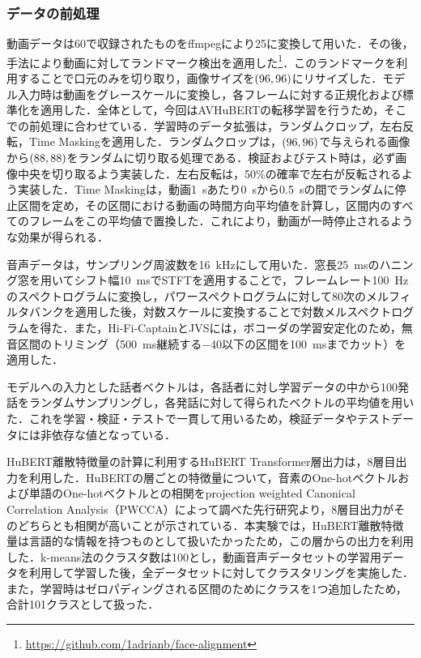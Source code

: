 \subsubsection{データの前処理}
動画データは\SI{60}{\fps}で収録されたものをffmpegにより\SI{25}{\fps}に変換して用いた．その後，手法\cite{bulat2017far}により動画に対してランドマーク検出を適用した\footnote{\url{https://github.com/1adrianb/face-alignment}}．このランドマークを利用することで口元のみを切り取り，画像サイズを$\left(96, 96\right)$にリサイズした．モデル入力時は動画をグレースケールに変換し，各フレームに対する正規化および標準化を適用した．全体として，今回はAVHuBERTの転移学習を行うため，そこでの前処理に合わせている．学習時のデータ拡張は，ランダムクロップ，左右反転，Time Maskingを適用した．ランダムクロップは，$\left(96, 96\right)$で与えられる画像から$\left(88, 88\right)$をランダムに切り取る処理である．検証およびテスト時は，必ず画像中央を切り取るよう実装した．左右反転は，50\%の確率で左右が反転されるよう実装した．Time Maskingは，動画\SI{1}{\s}あたり\SI{0}{\s}から\SI{0.5}{\s}の間でランダムに停止区間を定め，その区間における動画の時間方向平均値を計算し，区間内のすべてのフレームをこの平均値で置換した．これにより，動画が一時停止されるような効果が得られる．

音声データは，サンプリング周波数を\SI{16}{\kHz}にして用いた．窓長\SI{25}{\ms}のハニング窓を用いてシフト幅\SI{10}{\ms}でSTFTを適用することで，フレームレート\SI{100}{\Hz}のスペクトログラムに変換し，パワースペクトログラムに対して80次のメルフィルタバンクを適用した後，対数スケールに変換することで対数メルスペクトログラムを得た．また，Hi-Fi-CaptainとJVSには，ボコーダの学習安定化のため，無音区間のトリミング（\SI{500}{\ms}継続する\SI{-40}{\dBFS}以下の区間を\SI{100}{\ms}までカット）を適用した．

モデルへの入力とした話者ベクトルは，各話者に対し学習データの中から100発話をランダムサンプリングし，各発話に対して得られたベクトルの平均値を用いた．これを学習・検証・テストで一貫して用いるため，検証データやテストデータには非依存な値となっている．

HuBERT離散特徴量の計算に利用するHuBERT Transformer層出力は，8層目出力を利用した．HuBERTの層ごとの特徴量について，音素のOne-hotベクトルおよび単語のOne-hotベクトルとの相関をprojection weighted Canonical Correlation Analysis（PWCCA）\cite{morcos2018insights}によって調べた先行研究\cite{pasad2023comparative}より，8層目出力がそのどちらとも相関が高いことが示されている．本実験では，HuBERT離散特徴量は言語的な情報を持つものとして扱いたかったため，この層からの出力を利用した．k-means法のクラスタ数は100とし，動画音声データセットの学習用データを利用して学習した後，全データセットに対してクラスタリングを実施した．また，学習時はゼロパディングされる区間のためにクラスを1つ追加したため，合計101クラスとして扱った．

